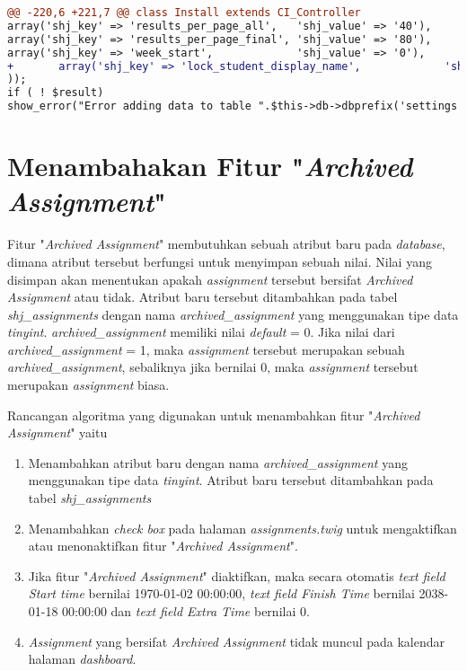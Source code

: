 \begin{lstlisting}[language=diff, caption=Perubahan kode program pada \textit{Install.php}, label=lst:21, basicstyle=\ttfamily, frame=single,
columns=fullflexible, keepspaces=true, breaklines=true]
@@ -220,6 +221,7 @@ class Install extends CI_Controller
array('shj_key' => 'results_per_page_all',   'shj_value' => '40'),
array('shj_key' => 'results_per_page_final', 'shj_value' => '80'),
array('shj_key' => 'week_start',             'shj_value' => '0'),
+   	array('shj_key' => 'lock_student_display_name',             'shj_value' => '1'),
));
if ( ! $result)
show_error("Error adding data to table ".$this->db->dbprefix('settings'));
\end{lstlisting}

\section{Menambahakan Fitur "\textit{Archived Assignment}"}
\label{chap:arc}
Fitur "\textit{Archived Assignment}" membutuhkan sebuah atribut baru pada \textit{database}, dimana atribut tersebut berfungsi untuk menyimpan sebuah nilai. Nilai yang disimpan akan menentukan apakah \textit{assignment} tersebut bersifat \textit{Archived Assignment} atau tidak. Atribut baru tersebut  ditambahkan pada tabel \textit{shj\_assignments} dengan nama \textit{archived\_assignment} yang menggunakan tipe data \textit{tinyint}. \textit{archived\_assignment} memiliki nilai \textit{default} = 0. Jika nilai dari \textit{archived\_assignment} = 1, maka \textit{assignment} tersebut merupakan sebuah \textit{archived\_assignment}, sebaliknya jika bernilai 0, maka \textit{assignment} tersebut merupakan \textit{assignment} biasa.

Rancangan algoritma yang digunakan untuk menambahkan fitur "\textit{Archived Assignment}" yaitu
\begin{enumerate}
	\item Menambahkan atribut baru dengan nama \textit{archived\_assignment} yang menggunakan tipe data \textit{tinyint}. Atribut baru tersebut ditambahkan pada tabel \textit{shj\_assignments}
	\item Menambahkan \textit{check box} pada halaman \textit{assignments.twig} untuk mengaktifkan atau menonaktifkan fitur "\textit{Archived Assignment}".
	\item Jika fitur "\textit{Archived Assignment}" diaktifkan, maka secara otomatis \textit{text field Start time} bernilai 1970-01-02 00:00:00, \textit{text field Finish Time} bernilai 2038-01-18 00:00:00 dan \textit{text field Extra Time} bernilai 0.
	\item \textit{Assignment} yang bersifat \textit{Archived Assignment} tidak muncul pada kalendar halaman \textit{dashboard}.
\end{enumerate}

